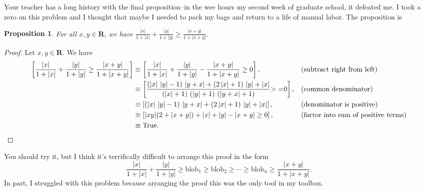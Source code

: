 \documentclass[12pt,fleqn]{article}
\newcommand{\reals}{\mathbf{R}}
\newcommand{\true}{\mathrm{True}}
\newenvironment{myproof}
  {\begin{shaded}\begin{proof}}
  {\end{proof}\end{shaded}}
\newtheorem{prop}{Proposition}
\begin{document}
Your teacher has a long history with the final proposition--in the wee hours my second week of graduate school, it defeated me. I took a
zero on this problem and I thought that maybe I needed to pack my bags and return to a life of manual labor. The proposition is 

\begin{prop} For all $x,y \in \reals$, we have $\displaystyle \frac{|x|}{1 + |x|} +     \frac{|y|}{1 + |y|}  \geq   \frac{|x+y|}{1 + |x+y|}    $.  \end{prop}            

\begin{myproof} Let  $x,y \in \reals$.  We have
\begin{align*}
  \left[\frac{|x|}{1 + |x|} +     \frac{|y|}{1 + |y|}  \geq   \frac{|x+y|}{1 + |x+y|}   \right] &\equiv 
       \left[\frac{|x|}{1 + |x|} +     \frac{|y|}{1 + |y|}  -  \frac{|x+y|}{1 + |x+y|}   \geq 0  \right],  && \mbox{(subtract right from left)} \\
        &\equiv \left[  \frac{\left( \left| x\right| \, \left| y\right| -1\right) \, \left| y+x\right| +\left( 2 \left| x\right| +1\right) \, \left| y\right| +\left| x\right| }{\left( \left| x\right| +1\right) \, \left( \left| y\right| +1\right) \, \left( \left| y+x\right| +1\right) }\mbox{>  =}0 \right], 
        && \mbox{(common denominator)}      \\
        &\equiv \left[ \left( \left| x\right| \, \left| y\right| -1\right) \, \left| y+x\right| +\left( 2 \left| x\right| +1\right) \, \left| y\right| +\left| x\right|  \right], &&\mbox{(denominator is positive)} \\
        &\equiv \left[  |x y| (2 + |x+y|) + |x| + |y| - |x + y|  \geq 0  \right],  && \mbox{(factor into sum of positive terms)} \\
        &\equiv \true. \qedhere
 \end{align*}
\end{myproof}
\noindent You should try it, but I think it's terrifically difficult to arrange this proof in the form 
\begin{equation*} 
   \frac{|x|}{1 + |x|} +     \frac{|y|}{1 + |y|} \geq \mbox{blob}_1 
\geq \mbox{blob}_2 \geq \cdots  \geq \mbox{blob}_n  \geq  \frac{|x+y|}{1 + |x+y|}.
\end{equation*}
In part, I struggled with this problem because arranging the proof this was the only tool in my toolbox.
\end{document}

